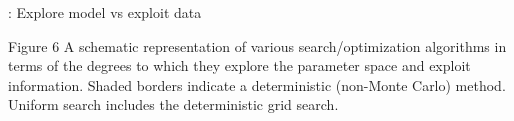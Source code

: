 

\begin{frame}[c]{\titleprefix: Explore model vs exploit data}

  \centering

  \begin{minipage}{0.5\textwidth}
  \end{minipage}
  \begin{minipage}{0.42\textwidth}
    \tiny
    \begin{figureblock}{Figure 6}
      A schematic representation of various search/optimization algorithms
      in terms of the degrees to which they explore the parameter space and
      exploit information.
      Shaded borders indicate a deterministic (non-Monte Carlo) method.
      Uniform search includes the deterministic grid search.
    \end{figureblock}
  \end{minipage}

\end{frame}
